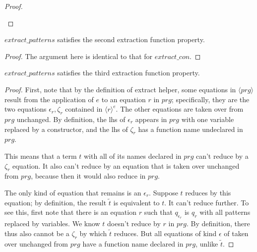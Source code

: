 \begin{lemma}
\begin{proof}
\begin{enumerate}
\end{enumerate}

\end{proof}

\end{lemma}

\begin{lemma}

$extract\_patterns$ satisfies the second extraction function property.

\begin{proof} The argument here is identical to that for $extract\_con$.

\end{proof}

\end{lemma}

\begin{lemma}

$extract\_patterns$ satisfies the third extraction function property.

\begin{proof}

First, note that by the definition of extract helper, some equations in $\langle prg \rangle$ result from the application of $e$ to an equation $r$ in $prg$; specifically, they are the two equations $\epsilon_r, \zeta_r$ contained in $\langle r \rangle^e$. The other equations are taken over from $prg$ unchanged. By definition, the lhs of $\epsilon_r$ appears in $prg$ with one variable replaced by a constructor, and the lhs of $\zeta_r$ has a function name undeclared in $prg$.

This means that a term $t$ with all of its names declared in $prg$ can't reduce by a $\zeta_r$ equation. It also can't reduce by an equation that is taken over unchanged from $prg$, because then it would also reduce in $prg$.

The only kind of equation that remains is an $\epsilon_r$. Suppose $t$ reduces by this equation; by definition, the result $\widetilde{t}$ is equivalent to $t$. It can't reduce further. To see this, first note that there is an equation $r$ such that $q_{\epsilon_r}$ is $q_r$ with all patterns replaced by variables. We know $t$ doesn't reduce by $r$ in $prg$. By definition, there thus also cannot be a $\zeta_r$ by which $\widetilde{t}$ reduces. But all equations of kind $\epsilon$ of taken over unchanged from $prg$ have a function name declared in $prg$, unlike $\widetilde{t}$.

\end{proof}

\end{lemma}

